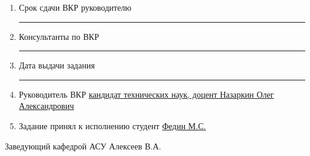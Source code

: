 {\begin{enumerate}
        \item Срок сдачи ВКР руководителю \uline{\hfill}\\
        \rule{\textwidth}{0.5pt}

        \item Консультанты по ВКР \uline{\hfill}\\
        \rule{\textwidth}{0.5pt}

        \item Дата выдачи задания \uline{\hfill}\\
        \rule{\textwidth}{0.5pt}

        \item Руководитель ВКР \uline{
            кандидат технических наук, доцент Назаркин Олег Александрович\hfill
        }

        \item Задание принял к исполнению студент \uline{
            Федин М.С.\hfill
        }
    \end{enumerate}

    Заведующий кафедрой АСУ Алексеев В.А. \uline{\hfill}

}
